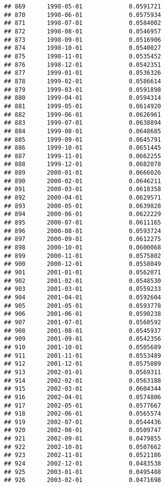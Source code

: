 \documentclass[
]{article}
\begin{document}
\begin{verbatim}
## 869      1998-05-01             0.0591721
## 870      1998-06-01             0.0575934
## 871      1998-07-01             0.0584002
## 872      1998-08-01             0.0546957
## 873      1998-09-01             0.0516906
## 874      1998-10-01             0.0540027
## 875      1998-11-01             0.0535452
## 876      1998-12-01             0.0542351
## 877      1999-01-01             0.0536326
## 878      1999-02-01             0.0586614
## 879      1999-03-01             0.0591898
## 880      1999-04-01             0.0594314
## 881      1999-05-01             0.0614920
## 882      1999-06-01             0.0626961
## 883      1999-07-01             0.0638894
## 884      1999-08-01             0.0648685
## 885      1999-09-01             0.0645791
## 886      1999-10-01             0.0651445
## 887      1999-11-01             0.0662255
## 888      1999-12-01             0.0682078
## 889      2000-01-01             0.0666026
## 890      2000-02-01             0.0646211
## 891      2000-03-01             0.0618358
## 892      2000-04-01             0.0629571
## 893      2000-05-01             0.0639828
## 894      2000-06-01             0.0622229
## 895      2000-07-01             0.0611165
## 896      2000-08-01             0.0593724
## 897      2000-09-01             0.0612275
## 898      2000-10-01             0.0600068
## 899      2000-11-01             0.0575802
## 900      2000-12-01             0.0558049
## 901      2001-01-01             0.0562071
## 902      2001-02-01             0.0548530
## 903      2001-03-01             0.0559233
## 904      2001-04-01             0.0592604
## 905      2001-05-01             0.0593778
## 906      2001-06-01             0.0590238
## 907      2001-07-01             0.0560592
## 908      2001-08-01             0.0545937
## 909      2001-09-01             0.0542356
## 910      2001-10-01             0.0505689
## 911      2001-11-01             0.0553489
## 912      2001-12-01             0.0575089
## 913      2002-01-01             0.0569311
## 914      2002-02-01             0.0563188
## 915      2002-03-01             0.0604344
## 916      2002-04-01             0.0574806
## 917      2002-05-01             0.0577667
## 918      2002-06-01             0.0565574
## 919      2002-07-01             0.0544436
## 920      2002-08-01             0.0509747
## 921      2002-09-01             0.0479855
## 922      2002-10-01             0.0507662
## 923      2002-11-01             0.0521186
## 924      2002-12-01             0.0483538
## 925      2003-01-01             0.0495488
## 926      2003-02-01             0.0471698

\end{verbatim}
\end{document}

